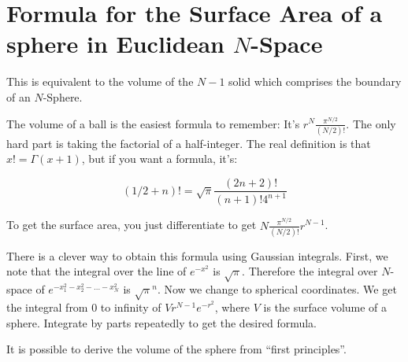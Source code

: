 \section{Formula for the Surface Area of a sphere in Euclidean $N$-Space}
This is equivalent to the volume of the $N-1$ solid which comprises the
boundary of an $N$-Sphere.

The volume of a ball is the easiest formula to remember: It's $r^N
\frac{\pi^{N/2}}{(N/2)!}$.  The only hard part is taking the factorial
of a half-integer.  The real definition is that $x! = \Gamma(x+1)$, but
if you want a formula, it's:

\[
(1/2+n)! = \sqrt{\pi} \frac{(2n+2)!}{(n+1)!4^{n+1}}
\]

To get the surface area, you just differentiate to get
$N\frac{\pi^{N/2}}{(N/2)!}r^{N-1}$.

There is a clever way to obtain this formula using Gaussian
integrals. First, we note that the integral over the line of $e^{-x^2}$
is $\sqrt{\pi}$.  Therefore the integral over $N$-space of
$e^{-x_1^2-x_2^2-...-x_N^2}$ is $\sqrt{\pi}^n$.  Now we change to
spherical coordinates.  We get the integral from 0 to infinity of
$Vr^{N-1}e^{-r^2}$, where $V$ is the surface volume of a sphere.
Integrate by parts repeatedly to get the desired formula.

It is possible to derive the volume of the sphere from ``first
principles''.
